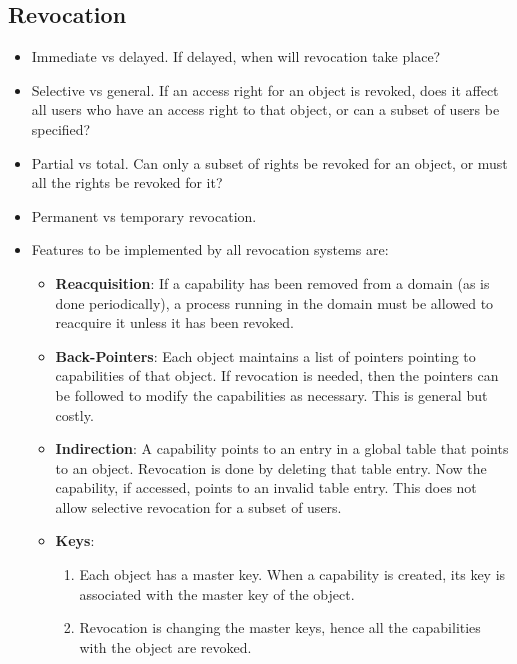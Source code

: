 \documentclass{article}
\theoremstyle{plain}
\theoremstyle{definition}
\begin{document}
\subsection{Revocation}
\begin{itemize}
    \item Immediate vs delayed. If delayed, when will revocation take place?
    
    \item Selective vs general. If an access right for an object is revoked, does it affect all users who have an access right to that object, or can a subset of users be specified?
    
    \item Partial vs total. Can only a subset of rights be revoked for an object, or must all the rights be revoked for it?
    
    \item Permanent vs temporary revocation. 
    
    \item Features to be implemented by all revocation systems are:
    \begin{itemize}
        \item \textbf{Reacquisition}: If a capability has been removed from a domain (as is done periodically), a process running in the domain must be allowed to reacquire it unless it has been revoked. 
        
        \item \textbf{Back-Pointers}: Each object maintains a list of pointers pointing to capabilities of that object. If revocation is needed, then the pointers can be followed to modify the capabilities as necessary. This is general but costly. 
        
        \item \textbf{Indirection}: A capability points to an entry in a global table that points to an object. Revocation is done by deleting that table entry. Now the capability, if accessed, points to an invalid table entry. This does not allow selective revocation for a subset of users. 
        
        \item \textbf{Keys}:
        \begin{enumerate}
            \item Each object has a master key. When a capability is created, its key is associated with the master key of the object. 
            
            \item Revocation is changing the master keys, hence all the capabilities with the object are revoked. 
            

\end{enumerate}
\end{itemize}
\end{itemize}
\end{document}
